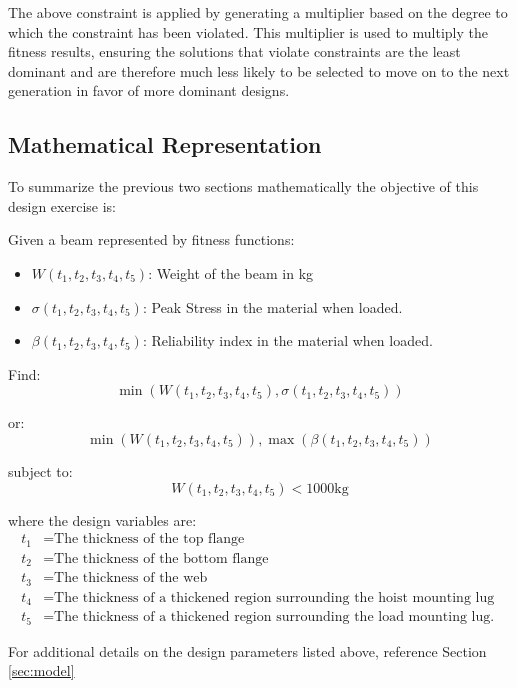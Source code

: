 The above constraint is applied by generating a multiplier based on the degree to which the constraint has been violated. This multiplier is used to multiply the fitness results, ensuring the solutions that violate constraints are the least dominant and are therefore much less likely to be selected to move on to the next generation in favor of more dominant designs.

\subsection{Mathematical Representation}
To summarize the previous two sections mathematically the objective of this design exercise is: 

Given a beam represented by fitness functions: 

\begin{itemize}
  \item $W(t_1, t_2, t_3, t_4, t_5)$: Weight of the beam in kg
  \item $\sigma(t_1, t_2, t_3, t_4, t_5)$: Peak Stress in the material when loaded. 
  \item $\beta(t_1, t_2, t_3, t_4, t_5)$: Reliability index in the material when loaded. 
\end{itemize}

Find: 
	$$\min\left(W(t_1, t_2, t_3, t_4, t_5), \sigma(t_1, t_2, t_3, t_4, t_5)\right)$$

or: 
	$$\min\left(W(t_1, t_2, t_3, t_4, t_5)\right), \max\left(\beta(t_1, t_2, t_3, t_4, t_5)\right)$$

subject to:
	$$W(t_1, t_2, t_3, t_4, t_5) < 1000 \text{kg}$$

where the design variables are:
\begin{align*}
   t_1 &= \text{The thickness of the top flange}\\
   t_2 &= \text{The thickness of the bottom flange}\\
   t_3 &= \text{The thickness of the web}\\
   t_4 &= \text{The thickness of a thickened region surrounding the hoist mounting lug}\\
   t_5 &= \text{The thickness of a thickened region surrounding the load mounting lug. }
\end{align*}

For additional details on the design parameters listed above, reference Section \ref{sec:model}

